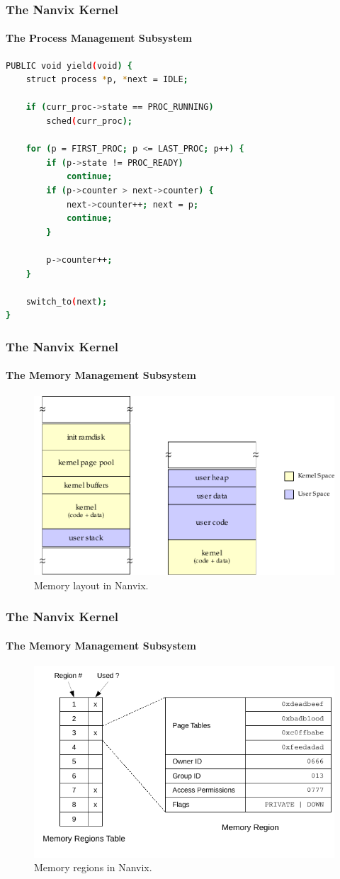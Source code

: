\documentclass{beamer}
\begin{document}
		\begin{frame}[containsverbatim]
		\frametitle{The Nanvix Kernel}
		\framesubtitle{The Process Management Subsystem}
	\begin{lstlisting}[language=bash,numbers=none,frame=single]
PUBLIC void yield(void) {
	struct process *p, *next = IDLE;

	if (curr_proc->state == PROC_RUNNING)
		sched(curr_proc);

	for (p = FIRST_PROC; p <= LAST_PROC; p++) {
		if (p->state != PROC_READY)
			continue;
		if (p->counter > next->counter) {
			next->counter++; next = p;
			continue;
		}
			
		p->counter++;
	}
	
	switch_to(next);
}
	\end{lstlisting}
\end{frame}

		\begin{frame}
		\frametitle{The Nanvix Kernel}
		\framesubtitle{The Memory Management Subsystem}
			\begin{figure}
				\centering
				\includegraphics[width=0.9\linewidth]{memory-layout}
				\caption{Memory layout in Nanvix.}
			\end{figure}
		\end{frame}

		\begin{frame}
		\frametitle{The Nanvix Kernel}
		\framesubtitle{The Memory Management Subsystem}
			\begin{figure}
				\centering
				\includegraphics[width=\linewidth]{memory-regions}
				\caption{Memory regions in Nanvix.}
			\end{figure}
		\end{frame}
\end{document}
